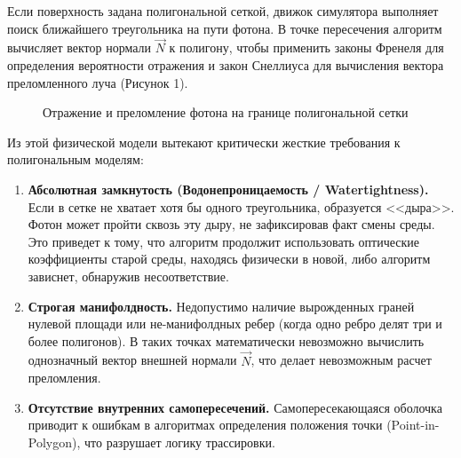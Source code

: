 \documentclass[a4paper,14pt]{article}
\begin{document}
Если поверхность задана полигональной сеткой, движок симулятора выполняет поиск ближайшего треугольника на пути фотона. В точке пересечения алгоритм вычисляет вектор нормали $\vec{N}$ к полигону, чтобы применить законы Френеля для определения вероятности отражения и закон Снеллиуса для вычисления вектора преломленного луча (Рисунок 1).

\begin{figure}[H]
    \centering
    \caption{Отражение и преломление фотона на границе полигональной сетки}
\end{figure}

Из этой физической модели вытекают критически жесткие требования к полигональным моделям:
\begin{enumerate}
    \item \textbf{Абсолютная замкнутость (Водонепроницаемость / Watertightness).} Если в сетке не хватает хотя бы одного треугольника, образуется <<дыра>>. Фотон может пройти сквозь эту дыру, не зафиксировав факт смены среды. Это приведет к тому, что алгоритм продолжит использовать оптические коэффициенты старой среды, находясь физически в новой, либо алгоритм зависнет, обнаружив несоответствие.
    \item \textbf{Строгая манифолдность.} Недопустимо наличие вырожденных граней нулевой площади или не-манифолдных ребер (когда одно ребро делят три и более полигонов). В таких точках математически невозможно вычислить однозначный вектор внешней нормали $\vec{N}$, что делает невозможным расчет преломления.
    \item \textbf{Отсутствие внутренних самопересечений.} Самопересекающаяся оболочка приводит к ошибкам в алгоритмах определения положения точки (Point-in-Polygon), что разрушает логику трассировки.
\end{enumerate}
\end{document}

